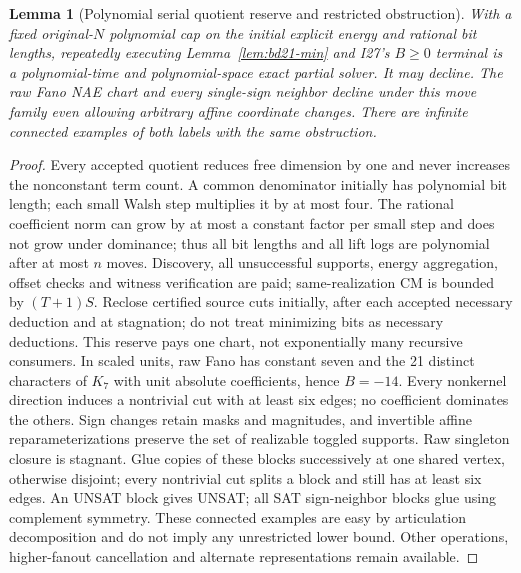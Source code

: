 \documentclass[11pt]{article}
\newtheorem{lemma}[theorem]{Lemma}
\begin{document}
\begin{lemma}[Polynomial serial quotient reserve and restricted obstruction]\label{lem:bd21-reserve}
With a fixed original-$N$ polynomial cap on the initial explicit energy and rational bit lengths, repeatedly executing Lemma~\ref{lem:bd21-min} and I27's $B\ge0$ terminal is a polynomial-time and polynomial-space exact partial solver. It may decline. The raw Fano NAE chart and every single-sign neighbor decline under this move family even allowing arbitrary affine coordinate changes. There are infinite connected examples of both labels with the same obstruction.
\end{lemma}
\begin{proof}
Every accepted quotient reduces free dimension by one and never increases the nonconstant term count. A common denominator initially has polynomial bit length; each small Walsh step multiplies it by at most four. The rational coefficient norm can grow by at most a constant factor per small step and does not grow under dominance; thus all bit lengths and all lift logs are polynomial after at most $n$ moves. Discovery, all unsuccessful supports, energy aggregation, offset checks and witness verification are paid; same-realization CM is bounded by $(T+1)S$. Reclose certified source cuts initially, after each accepted necessary deduction and at stagnation; do not treat minimizing bits as necessary deductions. This reserve pays one chart, not exponentially many recursive consumers. In scaled units, raw Fano has constant seven and the 21 distinct characters of $K_7$ with unit absolute coefficients, hence $B=-14$. Every nonkernel direction induces a nontrivial cut with at least six edges; no coefficient dominates the others. Sign changes retain masks and magnitudes, and invertible affine reparameterizations preserve the set of realizable toggled supports. Raw singleton closure is stagnant. Glue copies of these blocks successively at one shared vertex, otherwise disjoint; every nontrivial cut splits a block and still has at least six edges. An UNSAT block gives UNSAT; all SAT sign-neighbor blocks glue using complement symmetry. These connected examples are easy by articulation decomposition and do not imply any unrestricted lower bound. Other operations, higher-fanout cancellation and alternate representations remain available.
\end{proof}
\end{document}
